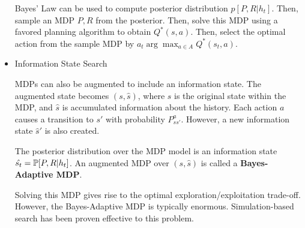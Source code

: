 \begin{itemize}
	Bayes' Law can be used to compute posterior distribution $p[P, R| h_t]$. Then, sample an MDP $P, R$ from the posterior. Then, solve this MDP using a favored planning algorithm to obtain $Q^*(s, a)$. Then, select the optimal action from the sample MDP by $a_t \arg\max_{a \in A} Q^*(s_t, a)$. 
		
	\item Information State Search
	
	MDPs can also be augmented to include an information state. The augmented state becomes $(s, \hat{s})$, where $s$ is the original state within the MDP, and $\hat{s}$ is accumulated information about the history. Each action $a$ causes a transition to $s'$ with probability $P^a_{ss'}$. However, a new information state $\hat{s}'$ is also created.
	
	The posterior distribution over the MDP model is an information state $\hat{s_t} = \operatorname{\mathbb{P}}[P, R| h_t]$. An augmented MDP over $(s, \hat{s})$ is called a \textbf{Bayes-Adaptive MDP}.
	
	Solving this MDP gives rise to the optimal exploration/exploitation trade-off. However, the Bayes-Adaptive MDP is typically enormous. Simulation-based search has been proven effective to this problem.
\end{itemize}